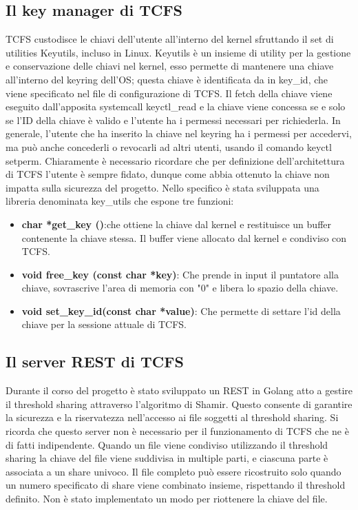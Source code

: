\subsection{Il key manager di TCFS} 
TCFS custodisce le chiavi dell'utente all'interno del kernel sfruttando il set di utilities Keyutils, incluso in Linux. Keyutils è un insieme di utility per la gestione e conservazione delle chiavi nel kernel, esso permette di mantenere una chiave all'interno del keyring dell'OS; questa chiave è identificata da in key\_id, che viene specificato nel file di configurazione di TCFS. Il fetch della chiave viene eseguito dall'apposita systemcall keyctl\_read e la chiave viene concessa se e solo se l'ID della chiave è valido e l'utente ha i permessi necessari per richiederla. In generale, l’utente che ha inserito la chiave nel keyring ha i permessi per accedervi, ma può anche concederli o revocarli ad altri utenti, usando il comando keyctl setperm. Chiaramente è necessario ricordare che per definizione dell'architettura di TCFS l'utente è sempre fidato, dunque come abbia ottenuto la chiave non impatta sulla sicurezza del progetto.
Nello specifico è stata sviluppata una libreria denominata key\_utils che espone tre funzioni:
\begin{itemize}
    \item \textbf{char *get\_key ()}:che ottiene la chiave dal kernel e restituisce un buffer contenente la chiave stessa. Il buffer viene allocato dal kernel e condiviso con TCFS.
    \item \textbf{void free\_key (const char *key)}: Che prende in input il puntatore alla chiave, sovrascrive l'area di memoria con "0" e libera lo spazio della chiave.
    \item \textbf{void set\_key\_id(const char *value)}: Che permette di settare l'id della chiave per la sessione attuale di TCFS.
\end{itemize}

\subsection{Il server REST di TCFS} 
Durante il corso del progetto è stato sviluppato un REST in Golang atto a gestire il threshold sharing attraverso l'algoritmo di Shamir. Questo consente di garantire la sicurezza e la riservatezza nell'accesso ai file soggetti al threshold sharing. Si ricorda che questo server non è necessario per il funzionamento di TCFS che ne è di fatti indipendente.
Quando un file viene condiviso utilizzando il threshold sharing la chiave del file viene suddivisa in multiple parti, e ciascuna parte è associata a un share univoco. Il file completo può essere ricostruito solo quando un numero specificato di share viene combinato insieme, rispettando il threshold definito. Non è stato implementato un modo per riottenere la chiave del file.

